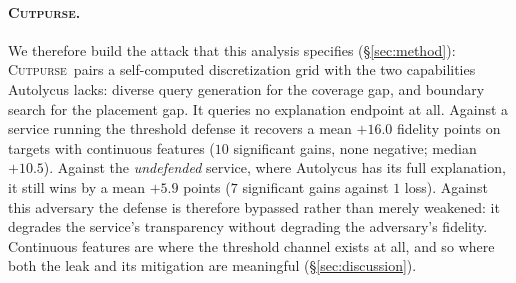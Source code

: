 \documentclass[sigconf,anonymous,review]{acmart}
\newcommand{\sys}{\textsc{Cutpurse}}
\begin{document}
\paragraph{\sys.}
We therefore build the attack that this analysis specifies (\S\ref{sec:method}):
\sys\ pairs a self-computed discretization grid with the two capabilities Autolycus lacks: diverse query generation for the coverage gap, and boundary search for the placement gap. It queries no
explanation endpoint at all. Against a service running the threshold defense it recovers
a mean $+16.0$ fidelity points on targets with continuous features ($10$ significant gains, none
negative; median $+10.5$). Against the \emph{undefended} service, where Autolycus has its full
explanation, it still wins by a mean $+5.9$ points ($7$ significant gains against $1$ loss). Against this adversary the defense is therefore bypassed rather than merely weakened: it degrades the
service's transparency without degrading the adversary's fidelity. Continuous features are where the threshold
channel exists at all, and so where both the leak and its mitigation are meaningful
(\S\ref{sec:discussion}).
\end{document}
